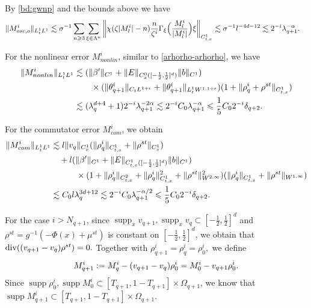 \documentclass[UTF-8,reqno]{amsart}
\numberwithin{equation}{section}
\theoremstyle{definition}
\DeclareMathOperator{\supp}{supp}
\def\({{\Big(}}
\def\){{\Big)}}
\newcommand{\norm}[1]{\left\|#1\right\|}
\def\geq{\geqslant}
\def\leq{\leqslant}
\def\div{\mathord{{\rm div}}}
\def\({{\Big(}}
\def\){{\Big)}}
\def\geq{\geqslant}
\def\leq{\leqslant}
\def\div{\mathord{{\rm div}}}
\begin{document}
 
 

 By \eqref{bd:gwnp} and the bounds above    we have
\begin{align}
   \|  M^{i}_{osc,o}\|_{L^1_tL^1}&\lesssim \sigma^{-1}\sum_{n\geq3}\sum_{\xi\in\Lambda^{n}}\norm{  \chi(\zeta|M_l^i|-n)\frac{n}{\zeta^i}\Gamma_{\xi}\(\frac{M^{i}_l}{|M^{i}_l|}\)\xi}_{C_{t,x}^1} \lesssim  \sigma^{-1}l^{-4d-12}
   \lesssim 2^{-i}\lambda_{q+1}^{-\alpha}.\notag
\end{align} 
 
For the nonlinear error $M_{nonlin}^i$,  similar to \eqref{arhorho-arhorho}, we have
\begin{align}
    \|M^{i}_{nonlin}\|_{L^1_tL^1} 
      &\lesssim (\|\beta' \|_{C^1 }+\|E \|_{C_{x}^0([-\frac12,\frac12]^d)}\|b\|_{C^1})\notag\\
       &\quad\quad\times ( \|\theta^{i}_{q+1}\|_{C_tL^{1+\epsilon}}+ \|\theta^{i}_{q+1}\|_{L^1_tW^{1,1+\epsilon}})  (1+\|\rho^{i}_{q}+\rho^{st}\|_{C_{t,x}^1})  \notag\\
      &\lesssim( \lambda_{q}^{d+4}+1)2^{-i}\lambda_{q+1}^{-2\alpha}\lesssim  2^{-i} C_0 \lambda_{q+1}^{-\alpha}\leq \frac{1}{5}C_02^{-i}\delta_{q+2}.\notag
\end{align} 


For the commutator error $M^i_{com} $,  we obtain
 \begin{align}
  \|M^i_{ com} \|_{L_t^1L^1}  & \lesssim l\|v_q\|_{C_{x}^1}(\|\rho_q^i\|_{C_{t,x}^1}+\|\rho^{st}\|_{C_{x}^1})\notag\\
  &\quad+l (\|\beta' \|_{C^1}+\|E \|_{C_{t,x}^1([-\frac12,\frac12]^d)}\|b\|_{C^1})\notag\\
  &\quad\quad\quad\times (1+  \| \rho_q^i \|_{C_{t,x}^2}+\| \rho_q^i\|_{C_{t,x}^1}^2+\|\rho^{st}\|_{W^{2,\infty}}^2)(\| \rho_q^i \|_{C_{t,x}^1}+\|\rho^{st}\|_{W^{1,\infty}})\notag\\
 &\lesssim  C_0 l\lambda_q^{3d+12}\lesssim  2^{-i}C_0  \lambda_{q+1}^{-\alpha/2}\leq \frac{1}{5}C_02^{-i}\delta_{q+2}.\notag 
   \end{align}    

   
For the case $i>N_{q+1}$, since $\supp_x v_{q+1},\supp_x v_q\subset [-\frac12,\frac12]^d$ and $\rho^{st}=g^{-1}(-\Phi(x)+\mu^{st})$ is constant on $[-\frac12,\frac12]^d$, we obtain that
$
\div((v_{q+1}-v_q) \rho^{st})=0.$ Together with $\rho_{q+1}^i=\rho_q^i=\rho_0^i,
$
we   define
\begin{align}
M_{q+1}^i
:=
M_q^i-(v_{q+1}-v_q)\rho_0^i
=
M_0^i-v_{q+1}\rho_0^i.
\notag
\end{align}
Since $\supp \rho^i_0,\supp M_0^i\subset[T_{q+1},1-T_{q+1}]\times\Omega_{q+1}$, we know that $\supp M_{q+1}^i\subset[T_{q+1},1-T_{q+1}]\times\Omega_{q+1}$.
\end{document}
